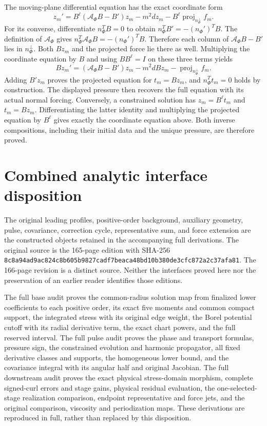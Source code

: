 \documentclass[10pt,a4paper]{article}
\begin{document}
The moving-plane differential equation has the exact coordinate form \[
z_m'=B^\ell(\mathcal A_\Phi B-B')z_m-m^2dz_m
-B^\ell\operatorname{proj}_{n_\Phi^\perp}f_m.
\] For its converse, differentiate \(n_\Phi^TB=0\) to obtain \(n_\Phi^TB'=-(n_\Phi')^TB\). The definition of \(\mathcal A_\Phi\) gives \(n_\Phi^T\mathcal A_\Phi B=-(n_\Phi')^TB\). Therefore each column of \(\mathcal A_\Phi B-B'\) lies in \(n_\Phi^\perp\). Both \(Bz_m\) and the projected force lie there as well. Multiplying the coordinate equation by \(B\) and using \(BB^\ell=I\) on these three terms yields \[
Bz_m'=(\mathcal A_\Phi B-B')z_m-m^2dBz_m
-\operatorname{proj}_{n_\Phi^\perp}f_m.
\] Adding \(B'z_m\) proves the projected equation for \(t_m=Bz_m\), and \(n_\Phi^Tt_m=0\) holds by construction. The displayed pressure then recovers the full equation with its actual normal forcing. Conversely, a constrained solution has \(z_m=B^\ell t_m\) and \(t_m=Bz_m\). Differentiating the latter identity and multiplying the projected equation by \(B^\ell\) gives exactly the coordinate equation above. Both inverse compositions, including their initial data and the unique pressure, are therefore proved.

\section{Combined analytic interface disposition}\label{gclosure:combined-analytic-interface-disposition}

The original leading profiles, positive-order background, auxiliary geometry, pulse, covariance, correction cycle, representative sum, and force extension are the constructed objects retained in the accompanying full derivations. The original source is the 165-page edition with SHA-256 \texttt{8c8a94ad9ac824c8b605b9827cadf7beaca48bd10b380de3cfc872a2c37afa81}. The 166-page revision is a distinct source. Neither the interfaces proved here nor the preservation of an earlier reader identifies those editions.

The full base audit proves the common-radius solution map from finalized lower coefficients to each positive order, its exact five moments and common compact support, the integrated stress with its original edge weight, the Borel potential cutoff with its radial derivative term, the exact chart powers, and the full reserved interval. The full pulse audit proves the phase and transport formulas, pressure sign, the constrained evolution and harmonic propagator, all fixed derivative classes and supports, the homogeneous lower bound, and the covariance integral with its angular half and original Jacobian. The full downstream audit proves the exact physical stress-domain morphism, complete signed-curl errors and stage gains, physical residual evaluation, the one-selected-stage realization comparison, endpoint representative and force jets, and the original comparison, viscosity and periodization maps. These derivations are reproduced in full, rather than replaced by this disposition.
\end{document}
